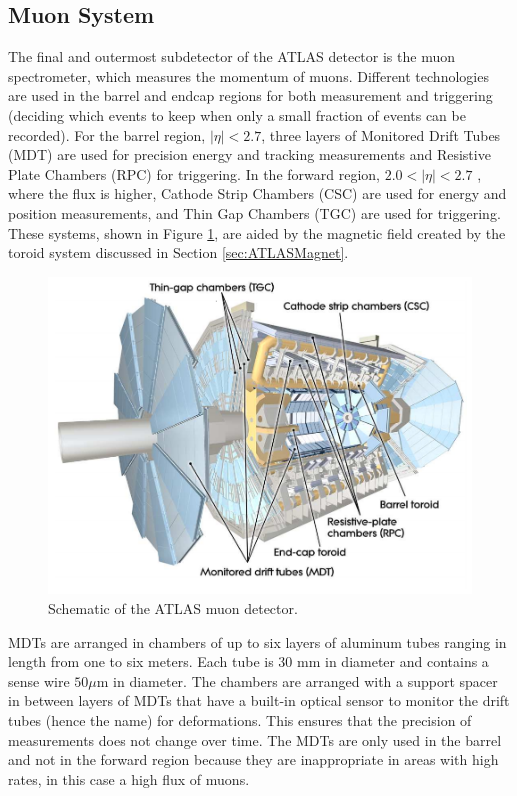 \subsection{Muon System}
\label{sec:MuCal}
The final and outermost subdetector of the ATLAS detector is the muon spectrometer, which measures the momentum of muons.  Different technologies are used in the barrel and endcap regions for both measurement and triggering (deciding which events to keep when only a small fraction of events can be recorded).  For the barrel region, $|\eta|<2.7$, three layers of Monitored Drift Tubes (MDT) are used for precision energy and tracking measurements and Resistive Plate Chambers (RPC) for triggering.  In the forward region, $2.0<|\eta|<2.7$ , where the flux is higher, Cathode Strip Chambers (CSC) are used for energy and position measurements, and Thin Gap Chambers (TGC) are used for triggering.  These systems, shown in Figure \ref{fig:ATLASMuonSys}, are aided by the magnetic field created by the toroid system discussed in Section \ref{sec:ATLASMagnet}.
\begin{figure}[ht!]
	\centering
	\includegraphics[width=\columnwidth]{../ThesisImages/LHCImages/ATLASMuonSystem.png}
	\caption[Schematic of the ATLAS muon detector.]{Schematic of the ATLAS muon detector\cite{ATLAS}.
	}
	\label{fig:ATLASMuonSys}
\end{figure}

MDTs are arranged in chambers of up to six layers of aluminum tubes ranging in length from one to six meters.  Each tube is 30 mm in diameter and contains a sense wire $50\mu\text{m}$ in diameter.  The chambers are arranged with a support spacer in between layers of MDTs that have a built-in optical sensor to monitor the drift tubes (hence the name) for deformations.  This ensures that the precision of measurements does not change over time.  The MDTs are only used in the barrel and not in the forward region because they are inappropriate in areas with high rates, in this case a high flux of muons. 

